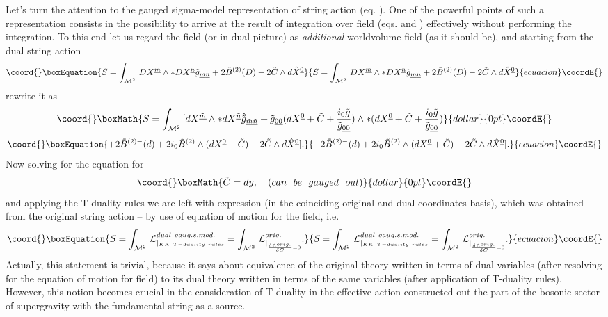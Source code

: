 \documentclass[a4paper,11pt]{article}
\begin{document}
Let's turn the attention to the gauged sigma-model representation of string
action (eq. ). One of the powerful points of such a representation
consists in the possibility to arrive at the result of integration over
\coordHE{} field (eqs.  and ) effectively without performing the
integration. To this end let us regard the field \coordHE{} (or \coordHE{} in dual
picture) as {\it additional} worldvolume field (as it should be),
and starting from the dual string action
\begin{equation}\coord{}\boxEquation{\plabel{SDd}
S=\int_{{\cal M}^2}\, DX^{\underline m}\wedge \ast DX^{\underline n}
{\tilde g}_{\underline{m}\underline{n}}+2{\tilde B}^{(2)}(D)
-2{\tilde C}\wedge d{\hat X}^{\underline 0}
}{S=\int_{{\cal M}^2}\, DX^{\underline m}\wedge \ast DX^{\underline n}
{\tilde g}_{\underline{m}\underline{n}}+2{\tilde B}^{(2)}(D)
-2{\tilde C}\wedge d{\hat X}^{\underline 0}
}{ecuacion}\coordE{}\end{equation}
rewrite it as
$$\coord{}\boxMath{
S=\int_{{\cal M}^2}\, [dX^{\underline{\tilde m}}\wedge \ast
dX^{\underline{\tilde n}}
\hat{\tilde g}_{\underline{\tilde m}\underline{\tilde n}}
+{\tilde g}_{\underline{00}}(dX^{\underline 0}+{\tilde C}
+{i_0 {\tilde g}\over {\tilde g}_{\underline{00}}})\wedge \ast
(dX^{\underline 0}+{\tilde C}
+{i_0 {\tilde g}\over {\tilde g}_{\underline{00}}})
}{dollar}{0pt}\coordE{}$$
\begin{equation}\coord{}\boxEquation{\plabel{SDd1}
+2{\tilde B}^{(2)-}(d)+2i_0 {\tilde B}^{(2)}\wedge (dX^{\underline 0}+
{\tilde C})-2{\tilde C}\wedge d{\hat X}^{\underline 0}].
}{+2{\tilde B}^{(2)-}(d)+2i_0 {\tilde B}^{(2)}\wedge (dX^{\underline 0}+
{\tilde C})-2{\tilde C}\wedge d{\hat X}^{\underline 0}].
}{ecuacion}\coordE{}\end{equation}
Now solving for the equation for \coordHE{}  $$\coord{}\boxMath{
{\tilde C}=dy,~~~(can~~be~~gauged~~out)
}{dollar}{0pt}\coordE{}$$
and applying the T-duality rules  we are left with expression 
(in the coinciding original and dual coordinates basis), which was obtained 
from the original string action -- by use of 
equation of motion for the \coordHE{} field, i.e.
\begin{equation}\coord{}\boxEquation{\plabel{conn}
S=\int_{{\cal M}^2}\,
{\cal L}^{dual~gaug.s.mod.}_{\vert_{KK~ T-duality~ rules}}
=\int_{{\cal M}^2}\, {\cal L}^{orig.}
_{\vert_{{\d {\cal L}^{orig.}\over \d C}=0}}.
}{S=\int_{{\cal M}^2}\,
{\cal L}^{dual~gaug.s.mod.}_{\vert_{KK~ T-duality~ rules}}
=\int_{{\cal M}^2}\, {\cal L}^{orig.}
_{\vert_{{\d {\cal L}^{orig.}\over \d C}=0}}.
}{ecuacion}\coordE{}\end{equation}
Actually, this statement is trivial, because it says about equivalence of
the original theory written in terms of dual variables (after resolving for the
equation of motion for \coordHE{} field) to its dual theory written in
terms of the same variables (after application of T-duality rules).  However,
this notion becomes crucial in the consideration of T-duality in the
effective action constructed out the part of the bosonic sector of supergravity
with the fundamental string as a source.
\end{document}
